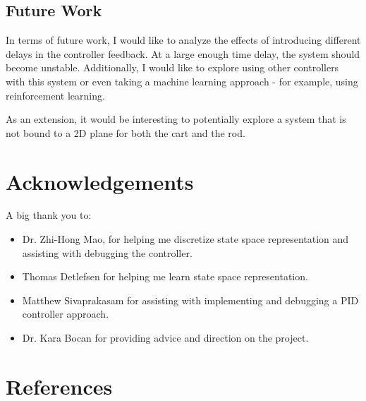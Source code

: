 \documentclass{article}
\begin{document}
\subsection{Future Work}
In terms of future work, I would like to analyze the effects of introducing different delays in the controller feedback. At a large enough time delay, the system should become unstable. Additionally, I would like to explore using other controllers with this system or even taking a machine learning approach - for example, using reinforcement learning. 

As an extension, it would be interesting to potentially explore a system that is not bound to a 2D plane for both the cart and the rod.

\section{Acknowledgements}
\noindent A big thank you to:
\begin{itemize}
    \item Dr. Zhi-Hong Mao, for helping me discretize state space representation and assisting with debugging the controller.
    \item Thomas Detlefsen for helping me learn state space representation.
    \item Matthew Sivaprakasam for assisting with implementing and debugging a PID controller approach.
    \item Dr. Kara Bocan for providing advice and direction on the project.
\end{itemize}


\section{References}
\end{document}
